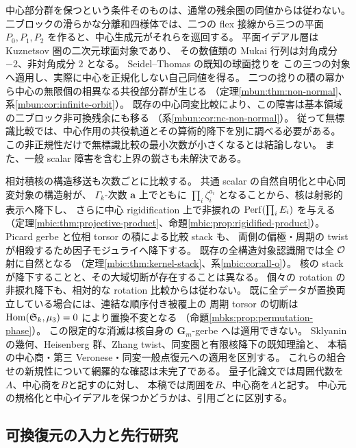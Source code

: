 中心部分群を保つという条件そのものは、通常の残余圏の同値からは従わない。
二ブロックの滑らかな分離和四様体では、二つの flex 接線から三つの平面
$P_0,P_1,P_2$ を作ると、中心生成元がそれらを巡回する。
平面イデアル層は Kuznetsov 圏の二次元球面対象であり、
その数値類の Mukai 行列は対角成分 $-2$、非対角成分 $2$ となる。
Seidel--Thomas の既知の球面捻り\cite[\S2b, Proposition~2.10]{MBUNSeidelThomas}を
この三つの対象へ適用し、実際に中心を正規化しない自己同値を得る。
二つの捻りの積の冪から中心の無限個の相異なる共役部分群が生じる
（定理\ref{mbun:thm:non-normal}、系\ref{mbun:cor:infinite-orbit}）。
既存の中心同変比較により、この障害は基本領域の二ブロック非可換残余にも移る
（系\ref{mbun:cor:nc-non-normal}）。
従って無標識比較では、中心作用の共役軌道とその算術的降下を別に調べる必要がある。
この非正規性だけで無標識比較の最小次数が小さくなるとは結論しない。
また、一般 scalar 障害を含む上界の鋭さも未解決である。

相対積核の構造移送も次数ごとに比較する。
共通 scalar の自然自明化と中心同変対象の構造射が、
$\Gamma_k$-次数 $\boldsymbol a$ 上でともに
$\prod_i\zeta_i^{a_i}$ となることから、核は射影的表示へ降下し、
さらに中心 rigidification 上で非捩れの $\operatorname{Perf}(\prod_iE_i)$ を与える
（定理\ref{mbic:thm:projective-product}、命題\ref{mbic:prop:rigidified-product}）。
Picard gerbe と位相 torsor の積による比較 stack も、
両側の偏極・周期の twist が相殺するため因子モジュライへ降下する。
既存の全構造対象認識開では全 $\mathcal O$ 射に自然となる
（定理\ref{mbic:thm:kernel-stack}、系\ref{mbic:cor:all-o}）。
核の stack が降下することと、その大域切断が存在することは異なる。
個々の rotation の非捩れ降下も、相対的な rotation 比較からは従わない。
既に全データが置換両立している場合には、連結な順序付き被覆上の
周期 torsor の切断は $\operatorname{Hom}(\mathfrak S_k,\mu_3)=0$ により置換不変となる
（命題\ref{mbks:prop:permutation-phase}）。
この限定的な消滅は核自身の $\mathbf G_m$-gerbe へは適用できない。
Sklyanin の幾何、Heisenberg 群、Zhang twist、同変圏と有限核降下の既知理論と、
本稿の中心商・第三 Veronese・同変一般点復元への適用を区別する。
これらの組合せの新規性について網羅的な確認は未完了である。
量子化論文では周囲代数を$A$、中心商を$B$と記すのに対し、
本稿では周囲を$B$、中心商を$A$と記す。
中心元の規格化と中心イデアルを保つかどうかは、引用ごとに区別する。

\subsection{可換復元の入力と先行研究}

